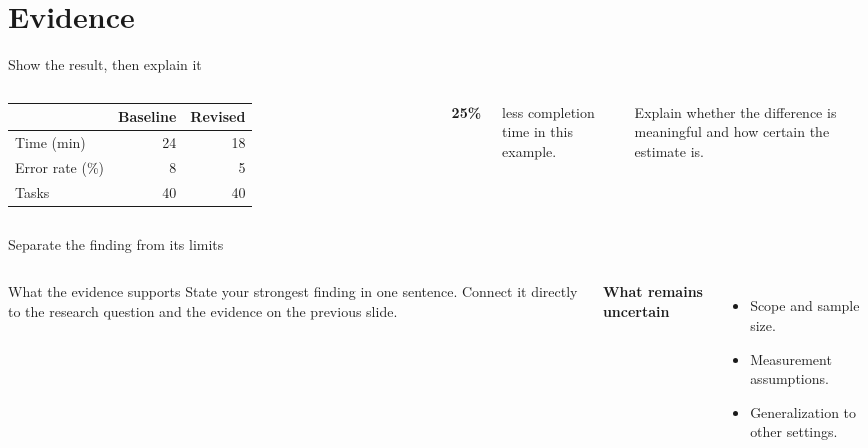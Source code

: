 \section{Evidence}
\begin{frame}{Show the result, then explain it}
\begin{columns}[c,onlytextwidth]
\centering
\begin{tabular}{@{}lrr@{}}
\toprule
& Baseline & Revised\\
\midrule
Time (min) & 24 & 18\\
Error rate (\%) & 8 & 5\\
Tasks & 40 & 40\\
\bottomrule
\end{tabular}
\par{}
{\Huge\bfseries\color{accent}25\%}\par\vspace{2mm}
less completion time in this example.\par\vspace{4mm}
Explain whether the difference is meaningful and how certain the estimate is.
\end{columns}
\end{frame}

\begin{frame}{Separate the finding from its limits}
\begin{columns}[T,onlytextwidth]
\begin{block}{What the evidence supports}
State your strongest finding in one sentence. Connect it directly to the
research question and the evidence on the previous slide.
\end{block}
\textbf{What remains uncertain}\par\vspace{3mm}
\begin{itemize}\setlength{\itemsep}{3mm}
\item Scope and sample size.
\item Measurement assumptions.
\item Generalization to other settings.
\end{itemize}
\end{columns}
\end{frame}

